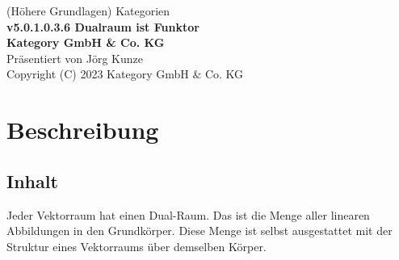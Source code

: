 \documentclass[a4paper]{amsart}
\theoremstyle{definition}
\begin{document}
\begin{titlepage}
\centering
{\huge
(Höhere Grundlagen) Kategorien\\[1cm]
\textbf{v5.0.1.0.3.6 Dualraum ist Funktor}
}\\[1cm]

\textbf{Kategory GmbH \& Co. KG}\\
Präsentiert von Jörg Kunze\\
Copyright (C) 2023 Kategory GmbH \& Co. KG

\end{titlepage}

%

\newpage

\section*{Beschreibung}

\subsection*{Inhalt}
Jeder Vektorraum hat einen Dual-Raum. Das ist die Menge aller linearen Abbildungen in den Grundkörper.
Diese Menge ist selbst ausgestattet mit der Struktur eines Vektorraums über demselben Körper.
\end{document}
